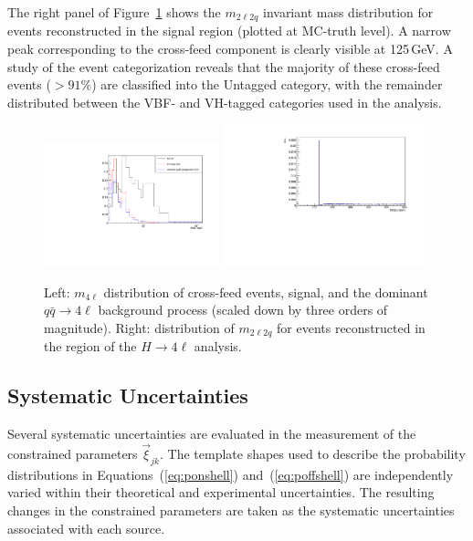 The right panel of Figure~\ref{fig:crossfeed} shows the $m_{2\ell2q}$ invariant mass distribution for events reconstructed in the \offshell signal region (plotted at MC-truth level). A narrow peak corresponding to the \onshell cross-feed component is clearly visible at 125\,GeV. A study of the event categorization reveals that the majority of these cross-feed events (\(>91\%\)) are classified into the Untagged category, with the remainder distributed between the VBF- and VH-tagged categories used in the analysis.


\begin{figure}[!hbt]
\centering
\includegraphics[width=0.45\textwidth]{figures/M4L_proj_incl.pdf}
\includegraphics[width=0.52\textwidth]{figures/phantomm2l2q.pdf}
\caption {
Left: $m_{4\ell}$ distribution of \onshell cross-feed events, \offshell signal, and the dominant 
$q\bar{q} \to 4\ell$ background process (scaled down by three orders of magnitude).
Right: distribution of $m_{2\ell2q}$ for events reconstructed in the \offshell region 
of the $H\to 4\ell$ analysis. 
\label{fig:crossfeed}}
\end{figure}

\subsection{Systematic Uncertainties}

Several systematic uncertainties are evaluated in the measurement of the constrained parameters $\vec{\xi}_{jk}$. The template shapes used to describe the probability distributions in Equations~(\ref{eq:ponshell}) and~(\ref{eq:poffshell}) are independently varied within their theoretical and experimental uncertainties. The resulting changes in the constrained parameters are taken as the systematic uncertainties associated with each source.

